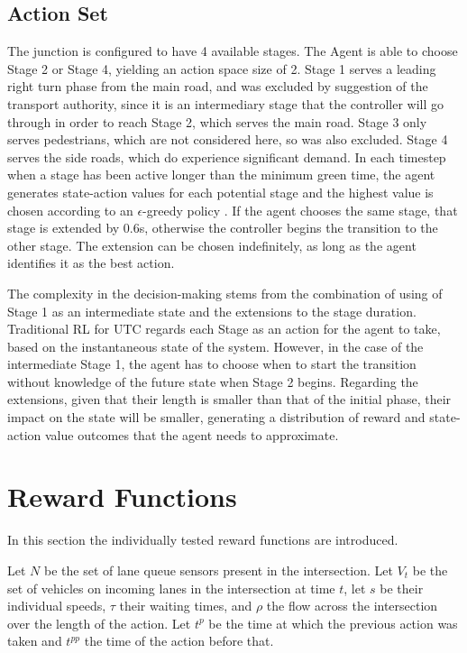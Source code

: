 \documentclass[conference]{IEEEtran}
\begin{document}
\subsection{Action Set}
The junction is configured to have 4 available stages. The Agent is able to choose Stage 2 or Stage 4, yielding an action space size of 2.
Stage 1 serves a leading right turn phase from the main road, and was excluded by suggestion of the transport authority, since it is an intermediary stage that the controller will go through in order to reach Stage 2, which serves the main road.
Stage 3 only serves pedestrians, which are not considered here, so was also excluded.
Stage 4 serves the side roads, which do experience significant demand.
In each timestep when a stage has been active longer than the minimum green time, the agent generates state-action values for each potential stage and the highest value is chosen according to an $\epsilon$-greedy policy \cite{suttonbarto}. If the agent chooses the same stage, that stage is extended by 0.6s, otherwise the controller begins the transition to the other stage.
The extension can be chosen indefinitely, as long as the agent identifies it as the best action.

The complexity in the decision-making stems from the combination of using of Stage 1 as an intermediate state and the extensions to the stage duration.
Traditional RL for UTC regards each Stage as an action for the agent to take, based on the instantaneous state of the system.
However, in the case of the intermediate Stage 1, the agent has to choose when to start the transition without knowledge of the future state when Stage 2 begins.
Regarding the extensions, given that their length is smaller than that of the initial phase, their impact on the state will be smaller, generating a distribution of reward and state-action value outcomes that the agent needs to approximate.

\section{Reward Functions} \label{rewards}
In this section the individually tested reward functions are introduced.

Let $N$ be the set of lane queue sensors present in the intersection.
Let $V_t$ be the set of vehicles on incoming lanes in the intersection at time $t$, let $s$ be their individual speeds, $\tau$ their waiting times, and $\rho$ the flow across the intersection over the length of the action.
Let $t^p$ be the time at which the previous action was taken and $t^{pp}$ the time of the action before that.
\end{document}
